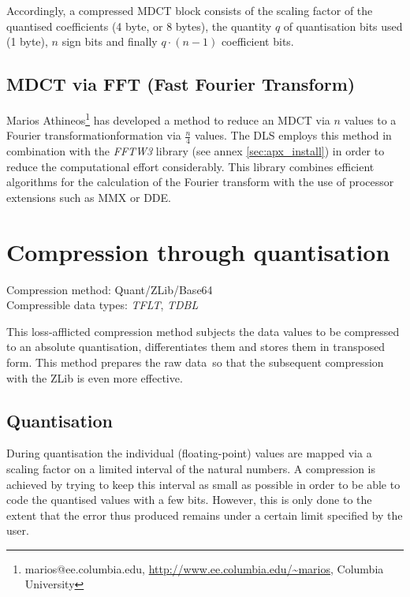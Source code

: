 \documentclass[a4paper,12pt,BCOR6mm,bibtotoc,idxtotoc]{scrbook}
\begin{document}
Accordingly, a compressed MDCT block consists of the scaling factor of the quantised coefficients (4 byte, or 8 bytes), the quantity $q$ of quantisation bits used (1 byte), $n$ sign bits and finally $q \cdot (n - 1) $ coefficient bits.

\subsection{MDCT via FFT (Fast Fourier Transform)}

Marios Athineos\footnote{marios@ee.columbia.edu, \url{http://www.ee.columbia.edu/~marios}, Columbia University} has developed a method to reduce an MDCT via $n$ values to a Fourier transformation\-formation  via $\frac{n}{4}$ values. The DLS employs this method in combination with the \textit{FFTW3} library (see annex \ref{sec:apx_install}) in order to reduce the computational effort considerably. This library combines efficient algorithms for the calculation of the Fourier transform with the use of processor extensions such as MMX or DDE.


\section{Compression through quantisation} \label{sec:comp_quant} 

Compression method: Quant/ZLib/Base64\\ Compressible data types: \textit{TFLT}, \textit{TDBL}

This loss-afflicted compression method subjects the data values to be compressed to an absolute quantisation, differentiates them and stores them in transposed form. This method prepares the \glqq raw data\grqq\  so that the subsequent compression with the ZLib is even more effective.

\subsection{Quantisation}

During quantisation the individual (floating-point) values are mapped via a scaling factor on a limited interval of the natural numbers. A compression is achieved by trying to keep this interval as small as possible in order to be able to code the quantised values with a few bits. However, this is only done to the extent that the error thus produced remains under a certain limit specified by the user.
\end{document}
